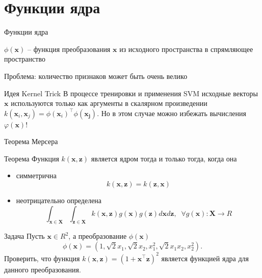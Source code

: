 \documentclass[10pt,a4paper]{beamer}
\begin{document}

\section{Функции ядра}


\begin{frame}{Функции ядра}

$\phi(\mathbf{x})$ --  функция преобразования $\mathbf x$ из исходного пространства в спрямляющее пространство

\vspace{1em}
Проблема: количество признаков может быть очень велико

\vspace{1em}
\begin{block}{Идея Kernel Trick}
В процессе тренировки и применения SVM исходные векторы $\mathbf x$ используются только как аргументы в скалярном произведении $k(\mathbf x_i, \mathbf{x}_j) = \phi(\mathbf x_i)^\top \phi(\mathbf{x_j})$. Но в этом случае можно избежать вычисления $\varphi(\mathbf x)$!
\end{block}

\end{frame}


\begin{frame}{Теорема Мерсера}

\begin{alertblock}{Теорема}
Функция $k(\mathbf x, \mathbf z)$ является ядром тогда и только тогда, когда она 
\begin{itemize}
\item симметрична 
\[
k(\mathbf x, \mathbf z) = k(\mathbf z, \mathbf x)
\]
\item неотрицательно определена
\[
\int_{\mathbf x \in \mathbf X} \int_{\mathbf z \in \mathbf X} k(\mathbf x, \mathbf z) g(\mathbf x) g(\mathbf z) d\mathbf x d\mathbf z, \;\; \forall g(\mathbf{x}): \mathbf{X} \rightarrow R
\]
\end{itemize}
\end{alertblock}

\begin{block}{Задача}
Пусть $\mathbf x \in R^2$, а преобразование $\phi(\mathbf{x})$
\[
\phi(\mathbf{x}) = (1, \sqrt{2} x_1, \sqrt{2} x_2, x_1^2, \sqrt{2} x_1 x_2, x_2^2).
\]
Проверить, что функция $k(\mathbf{x}, \mathbf{z}) = (1 + \mathbf x^\top \mathbf z)^2$ является функцией ядра для данного преобразования.
\end{block}

\end{frame}
\end{document}
